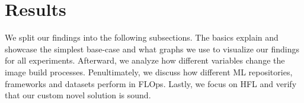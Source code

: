 \section{Results}

We split our findings into the following subsections.
The basics explain and showcase the simplest base-case and what graphs we use to visualize our findings for all experiments.
Afterward, we analyze how different variables change the image build processes.
Penultimately, we discuss how different ML repositories, frameworks and datasets perform in FLOps.
Lastly, we focus on HFL and verify that our custom novel solution is sound.







